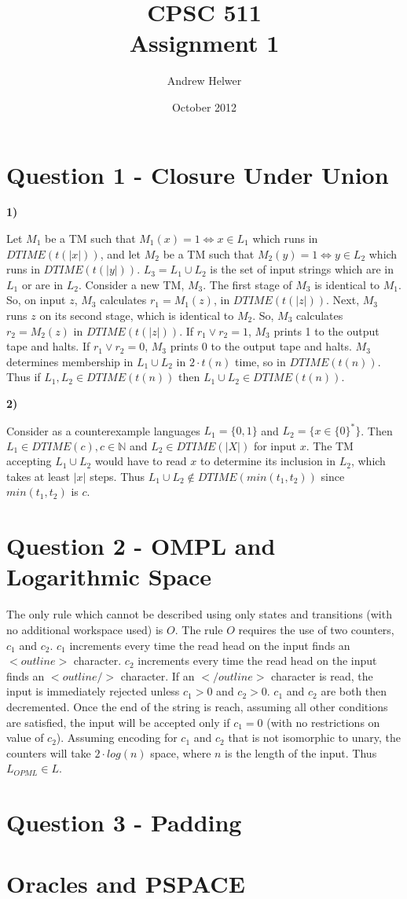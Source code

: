 \documentclass{article}
\begin{document}
\title{CPSC 511 \\ Assignment 1}
\author{Andrew Helwer}
\date{October 2012}
\maketitle

\section{Question 1 - Closure Under Union}

\textbf{1)}

Let $M_1$ be a TM such that $M_1(x) = 1 \Leftrightarrow x \in L_1$ which runs in $DTIME(t(|x|))$, and let $M_2$ be a TM such that $M_2(y) = 1 \Leftrightarrow y \in L_2$ which runs in $DTIME(t(|y|))$. 
$L_3 = L_1 \cup L_2$ is the set of input strings which are in $L_1$ or are in $L_2$.
Consider a new TM, $M_3$.
The first stage of $M_3$ is identical to $M_1$.
So, on input $z$, $M_3$ calculates $r_1 = M_1(z)$, in $DTIME(t(|z|))$.
Next, $M_3$ runs $z$ on its second stage, which is identical to $M_2$.
So, $M_3$ calculates $r_2 = M_2(z)$ in $DTIME(t(|z|))$.
If $r_1 \vee r_2 = 1$, $M_3$ prints 1 to the output tape and halts.
If $r_1 \vee r_2 = 0$, $M_3$ prints 0 to the output tape and halts.
$M_3$ determines membership in $L_1 \cup L_2$ in $2 \cdot t(n)$ time, so in $DTIME(t(n))$.
Thus if $L_1, L_2 \in DTIME(t(n))$ then $L_1 \cup L_2 \in DTIME(t(n))$.

\textbf{2)}

Consider as a counterexample languages $L_1 = \{0, 1\}$ and $L_2 = \{x \in \{0\}^*\}$. 
Then $L_1 \in DTIME(c), c \in \mathbb{N}$ and $L_2 \in DTIME(|X|)$ for input $x$. 
The TM accepting $L_1 \cup L_2$ would have to read $x$ to determine its inclusion in $L_2$, which takes at least $|x|$ steps. 
Thus $L_1 \cup L_2 \not \in DTIME(min(t_1, t_2))$ since $min(t_1, t_2)$ is $c$.

\section{Question 2 - OMPL and Logarithmic Space}

The only rule which cannot be described using only states and transitions (with no additional workspace used) is $O$.
The rule $O$ requires the use of two counters, $c_1$ and $c_2$.
$c_1$ increments every time the read head on the input finds an $<outline>$ character.
$c_2$ increments every time the read head on the input finds an $<outline/>$ character.
If an $</outline>$ character is read, the input is immediately rejected unless $c_1 > 0$ and $c_2 > 0$.
$c_1$ and $c_2$ are both then decremented.
Once the end of the string is reach, assuming all other conditions are satisfied, the input will be accepted only if $c_1 = 0$ (with no restrictions on value of $c_2$).
Assuming encoding for $c_1$ and $c_2$ that is not isomorphic to unary, the counters will take $2 \cdot log(n)$ space, where $n$ is the length of the input.
Thus $L_{OPML} \in L$.

\section{Question 3 - Padding}

\section{Oracles and PSPACE}
\end{document}
